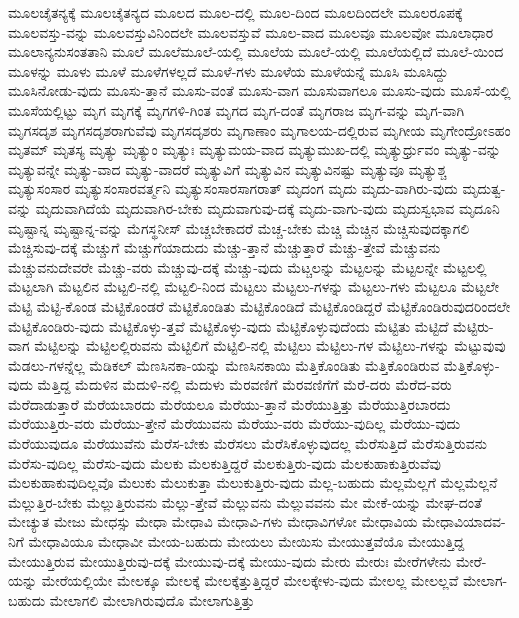 {ಮೂಲಚೈತನ್ಯಕ್ಕೆ
ಮೂಲಚೈತನ್ಯದ
ಮೂಲದ
ಮೂಲ-ದಲ್ಲಿ
ಮೂಲ-ದಿಂದ
ಮೂಲದಿಂದಲೇ
ಮೂಲರೂಪಕ್ಕೆ
ಮೂಲವಸ್ತು-ವನ್ನು
ಮೂಲವಸ್ತುವಿನಿಂದಲೇ
ಮೂಲವಸ್ತುವೆ
ಮೂಲ-ವಾದ
ಮೂಲವೂ
ಮೂಲವೋ
ಮೂಲಾಧಾರ
ಮೂಲಾನ್ಯನುಸಂತತಾನಿ
ಮೂಲೆ
ಮೂಲೆಮೂಲೆ-ಯಲ್ಲಿ
ಮೂಲೆಯ
ಮೂಲೆ-ಯಲ್ಲಿ
ಮೂಲೆಯಲ್ಲಿದೆ
ಮೂಲೆ-ಯಿಂದ
ಮೂಳನ್ನು
ಮೂಳು
ಮೂಳೆ
ಮೂಳೆಗಳಲ್ಲದೆ
ಮೂಳೆ-ಗಳು
ಮೂಳೆಯ
ಮೂಳೆಯನ್ನೆ
ಮೂಸಿ
ಮೂಸಿದ್ದು
ಮೂಸಿನೋಡು-ವುದು
ಮೂಸು-ತ್ತಾನೆ
ಮೂಸು-ವಂತೆ
ಮೂಸು-ವಾಗ
ಮೂಸುವಾಗಲೂ
ಮೂಸು-ವುದು
ಮೂಸೆ-ಯಲ್ಲಿ
ಮೂಸೆಯಲ್ಲಿಟ್ಟು
ಮೃಗ
ಮೃಗಕ್ಕೆ
ಮೃಗಗಳಿ-ಗಿಂತ
ಮೃಗದ
ಮೃಗ-ದಂತೆ
ಮೃಗರಾಜ
ಮೃಗ-ವನ್ನು
ಮೃಗ-ವಾಗಿ
ಮೃಗಸದೃಶ
ಮೃಗಸದೃಶರಾಗುವೆವು
ಮೃಗಸದೃಶರು
ಮೃಗಾಣಾಂ
ಮೃಗಾಲಯ-ದಲ್ಲಿರುವ
ಮೃಗೀಯ
ಮೃಗೇಂದ್ರೋಽಹಂ
ಮೃತಮ್
ಮೃತಸ್ಯ
ಮೃತ್ಯು
ಮೃತ್ಯುಂ
ಮೃತ್ಯುಃ
ಮೃತ್ಯುಮಯ-ವಾದ
ಮೃತ್ಯುಮುಖ-ದಲ್ಲಿ
ಮೃತ್ಯುರ್ಧ್ರುವಂ
ಮೃತ್ಯು-ವನ್ನು
ಮೃತ್ಯುವನ್ನೇ
ಮೃತ್ಯು-ವಾದ
ಮೃತ್ಯು-ವಾದರೆ
ಮೃತ್ಯುವಿಗೆ
ಮೃತ್ಯುವಿನ
ಮೃತ್ಯುವಿನಷ್ಟು
ಮೃತ್ಯುವೂ
ಮೃತ್ಯುಶ್ಚ
ಮೃತ್ಯುಸಂಸಾರ
ಮೃತ್ಯುಸಂಸಾರವರ್ತ್ಮನಿ
ಮೃತ್ಯುಸಂಸಾರಸಾಗರಾತ್
ಮೃದಂಗ
ಮೃದು
ಮೃದು-ವಾಗಿರು-ವುದು
ಮೃದುತ್ವ-ವನ್ನು
ಮೃದುವಾಗಿದೆಯೆ
ಮೃದುವಾಗಿರ-ಬೇಕು
ಮೃದುವಾಗುವು-ದಕ್ಕೆ
ಮೃದು-ವಾಗು-ವುದು
ಮೃದುಸ್ವಭಾವ
ಮೃದೂನಿ
ಮೃಷ್ಟಾನ್ನ
ಮೃಷ್ಟಾನ್ನ-ವನ್ನು
ಮೆಗಸ್ಥನೀಸ್
ಮೆಚ್ಚಬೇಕಾದರೆ
ಮೆಚ್ಚ-ಬೇಕು
ಮೆಚ್ಚಿ
ಮೆಚ್ಚಿನ
ಮೆಚ್ಚಿಸುವುದಕ್ಕಾಗಲಿ
ಮೆಚ್ಚಿಸುವು-ದಕ್ಕೆ
ಮೆಚ್ಚುಗೆ
ಮೆಚ್ಚುಗೆಯಾದುದು
ಮೆಚ್ಚು-ತ್ತಾನೆ
ಮೆಚ್ಚುತ್ತಾರೆ
ಮೆಚ್ಚು-ತ್ತೇವೆ
ಮೆಚ್ಚುವನು
ಮೆಚ್ಚುವನುದೇವರೇ
ಮೆಚ್ಚು-ವರು
ಮೆಚ್ಚುವು-ದಕ್ಕೆ
ಮೆಚ್ಚು-ವುದು
ಮೆಟ್ಚಲನ್ನು
ಮೆಟ್ಟಲನ್ನು
ಮೆಟ್ಟಲನ್ನೇ
ಮೆಟ್ಟಲಲ್ಲಿ
ಮೆಟ್ಟಲಾಗಿ
ಮೆಟ್ಟಲಿನ
ಮೆಟ್ಟಲಿ-ನಲ್ಲಿ
ಮೆಟ್ಟಲಿ-ನಿಂದ
ಮೆಟ್ಟಲು
ಮೆಟ್ಟಲು-ಗಳನ್ನು
ಮೆಟ್ಟಲು-ಗಳು
ಮೆಟ್ಟಲೂ
ಮೆಟ್ಟಲೇ
ಮೆಟ್ಟಿ
ಮೆಟ್ಟಿ-ಕೊಂಡ
ಮೆಟ್ಟಿಕೊಂಡರೆ
ಮೆಟ್ಟಿಕೊಂಡಿತು
ಮೆಟ್ಟಿಕೊಂಡಿದೆ
ಮೆಟ್ಟಿಕೊಂಡಿದ್ದರೆ
ಮೆಟ್ಟಿಕೊಂಡಿರುವುದರಿಂದಲೇ
ಮೆಟ್ಟಿಕೊಂಡಿರು-ವುದು
ಮೆಟ್ಟಿಕೊಳ್ಳು-ತ್ತವೆ
ಮೆಟ್ಟಿಕೊಳ್ಳು-ವುದು
ಮೆಟ್ಟಿಕೊಳ್ಳುವುದೆಂದು
ಮೆಟ್ಟಿತು
ಮೆಟ್ಟಿದೆ
ಮೆಟ್ಟಿರು-ವಾಗ
ಮೆಟ್ಟಿಲನ್ನು
ಮೆಟ್ಟಿಲಲ್ಲಿರುವನು
ಮೆಟ್ಟಿಲಿಗೆ
ಮೆಟ್ಟಿಲಿ-ನಲ್ಲಿ
ಮೆಟ್ಟಿಲು
ಮೆಟ್ಟಿಲು-ಗಳ
ಮೆಟ್ಟಿಲು-ಗಳನ್ನು
ಮೆಟ್ಟುವುವು
ಮೆಡಲು-ಗಳನ್ನೆಲ್ಲ
ಮೆಡಿಕಲ್
ಮೆಣಸಿನಕಾ-ಯನ್ನು
ಮೆಣಸಿನಕಾಯಿ
ಮೆತ್ತಿಕೊಂಡಿತು
ಮೆತ್ತಿಕೊಂಡಿರುವ
ಮೆತ್ತಿಕೊಳ್ಳು-ವುದು
ಮೆತ್ತಿದ್ದ
ಮೆದುಳಿನ
ಮೆದುಳಿ-ನಲ್ಲಿ
ಮೆದುಳು
ಮೆರವಣಿಗೆ
ಮೆರವಣಿಗೆಗೆ
ಮೆರೆ-ದರು
ಮೆರೆದ-ವರು
ಮೆರೆದಾಡುತ್ತಾರೆ
ಮೆರೆಯಬಾರದು
ಮೆರೆಯಲೂ
ಮೆರೆಯು-ತ್ತಾನೆ
ಮೆರೆಯುತ್ತಿತ್ತು
ಮೆರೆಯುತ್ತಿರಬಾರದು
ಮೆರೆಯುತ್ತಿರು-ವರು
ಮೆರೆಯು-ತ್ತೇನೆ
ಮೆರೆಯುವನು
ಮೆರೆಯು-ವರು
ಮೆರೆಯು-ವುದಿಲ್ಲ
ಮೆರೆಯು-ವುದು
ಮೆರೆಯುವುದೂ
ಮೆರೆಯುವೆನು
ಮೆರೆಸ-ಬೇಕು
ಮೆರೆಸಲು
ಮೆರೆಸಿಕೊಳ್ಳುವುದಲ್ಲ
ಮೆರೆಸುತ್ತಿದೆ
ಮೆರೆಸುತ್ತಿರುವನು
ಮೆರೆಸು-ವುದಿಲ್ಲ
ಮೆರೆಸು-ವುದು
ಮೆಲಕು
ಮೆಲಕುತ್ತಿದ್ದರೆ
ಮೆಲಕುತ್ತಿರು-ವುದು
ಮೆಲಕುಹಾಕುತ್ತಿರುವೆವು
ಮೆಲಕುಹಾಕುವುದಿಲ್ಲವೊ
ಮೆಲುಕು
ಮೆಲುಕುತ್ತಾ
ಮೆಲುಕುತ್ತಿರು-ವುದು
ಮೆಲ್ಲ-ಬಹುದು
ಮೆಲ್ಲಮೆಲ್ಲಗೆ
ಮೆಲ್ಲಮೆಲ್ಲನೆ
ಮೆಲ್ಲುತ್ತಿರ-ಬೇಕು
ಮೆಲ್ಲುತ್ತಿರುವನು
ಮೆಲ್ಲು-ತ್ತೇವೆ
ಮೆಲ್ಲುವನು
ಮೆಲ್ಲುವವನು
ಮೇ
ಮೇಕೆ-ಯನ್ನು
ಮೇಘ-ದಂತೆ
ಮೇಚ್ಯುತ
ಮೇಜು
ಮೇಧಸ್ಸು
ಮೇಧಾ
ಮೇಧಾವಿ
ಮೇಧಾವಿ-ಗಳು
ಮೇಧಾವಿಗಳೋ
ಮೇಧಾವಿಯ
ಮೇಧಾವಿಯಾದವ-ನಿಗೆ
ಮೇಧಾವಿಯೂ
ಮೇಧಾವೀ
ಮೇಯ-ಬಹುದು
ಮೇಯಲು
ಮೇಯಿಸು
ಮೇಯುತ್ತವೆಯೊ
ಮೇಯುತ್ತಿದ್ದ
ಮೇಯುತ್ತಿರುವ
ಮೇಯುತ್ತಿರುವು-ದಕ್ಕೆ
ಮೇಯುವು-ದಕ್ಕೆ
ಮೇಯು-ವುದು
ಮೇರು
ಮೇರುಃ
ಮೇರೆಗಳೇನು
ಮೇರೆ-ಯನ್ನು
ಮೇರೆಯಲ್ಲಿಯೇ
ಮೇಲಕ್ಕೂ
ಮೇಲಕ್ಕೆ
ಮೇಲಕ್ಕೆತ್ತುತ್ತಿದ್ದರೆ
ಮೇಲಕ್ಕೇಳು-ವುದು
ಮೇಲಲ್ಲ
ಮೇಲಲ್ಲವೆ
ಮೇಲಾಗ-ಬಹುದು
ಮೇಲಾಗಲಿ
ಮೇಲಾಗಿರುವುದೊ
ಮೇಲಾಗುತ್ತಿತ್ತು
}
